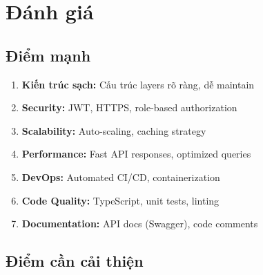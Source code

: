 \section{Đánh giá}

\subsection{Điểm mạnh}

\begin{enumerate}
    \item \textbf{Kiến trúc sạch:} Cấu trúc layers rõ ràng, dễ maintain
    \item \textbf{Security:} JWT, HTTPS, role-based authorization
    \item \textbf{Scalability:} Auto-scaling, caching strategy
    \item \textbf{Performance:} Fast API responses, optimized queries
    \item \textbf{DevOps:} Automated CI/CD, containerization
    \item \textbf{Code Quality:} TypeScript, unit tests, linting
    \item \textbf{Documentation:} API docs (Swagger), code comments
\end{enumerate}

\subsection{Điểm cần cải thiện}

